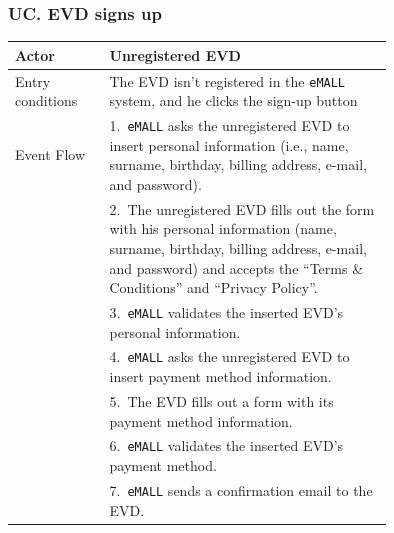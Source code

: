 \subsubsection*{UC\cuc . EVD signs up}
\begin{center}
    \begin{longtable}{lp{0.75\linewidth}}
        \hline
        Actor            & Unregistered EVD                                                                                                                                                                                       \\
        \hline
        Entry conditions & The EVD isn’t registered in the \verb|eMALL| system, and he clicks the sign-up button                                                                                                                  \\
        \hline
        Event Flow       & 1.\ \verb|eMALL| asks the unregistered EVD to insert personal information (i.e., name, surname, birthday, billing address, e-mail, and password).                                                      \\
        & 2.\ The unregistered EVD fills out the form with his personal information (name, surname, birthday, billing address, e-mail, and password) and accepts the “Terms \& Conditions” and “Privacy Policy”. \\
        & 3.\ \verb|eMALL| validates the inserted EVD’s personal information.                                                                                                                                    \\
        & 4.\ \verb|eMALL| asks the unregistered EVD to insert payment method information.                                                                                                                       \\
        & 5.\ The EVD fills out a form with its payment method information.                                                                                                                                      \\
        & 6.\ \verb|eMALL| validates the inserted EVD’s payment method.                                                                                                                                          \\
        & 7.\ \verb|eMALL| sends a confirmation email to the EVD.                                                                                                                                                \\

\end{longtable}
\end{center}
